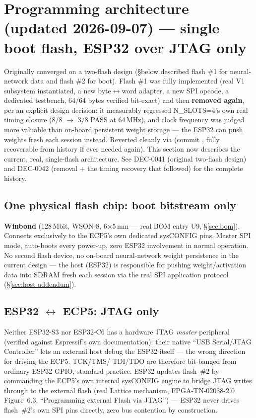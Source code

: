 \section{Programming architecture (updated 2026-09-07) --- single
boot flash, ESP32 over JTAG only}
\label{sec:prog-addendum}
\begin{fnwarn}
Originally converged on a two-flash design (\S below described flash
\#1 for neural-network data and flash \#2 for boot). Flash \#1 was
fully implemented (real V1 subsystem instantiated, a new byte$\leftrightarrow$word
adapter, a new SPI opcode, a dedicated testbench, 64/64 bytes verified
bit-exact) and then \textbf{removed again}, per an explicit design
decision: it measurably regressed N\_SLOTS=4's own real timing
closure (8/8 $\to$ 3/8 PASS at 64\,MHz), and clock frequency was
judged more valuable than on-board persistent weight storage --- the
ESP32 can push weights fresh each session instead. Reverted cleanly
via  (commit , fully recoverable from
history if ever needed again). This section now describes the
current, real, single-flash architecture. See 
DEC-0041 (original two-flash design) and DEC-0042 (removal + the
timing recovery that followed) for the complete history.
\end{fnwarn}

\subsection{One physical flash chip: boot bitstream only}
\textbf{Winbond } (128\,Mbit, WSON-8, 6$\times$5\,mm
--- real BOM entry U9, \S\ref{sec:bom}). Connects exclusively to the
ECP5's own dedicated sysCONFIG pins, Master SPI mode, auto-boots every
power-up, zero ESP32 involvement in normal operation. No second flash
device, no on-board neural-network
weight persistence in the current design --- the host (ESP32) is
responsible for pushing weight/activation data into SDRAM fresh each
session via the real SPI application protocol
(\S\ref{sec:host-addendum}).

\subsection{ESP32 $\leftrightarrow$ ECP5: JTAG only}
Neither ESP32-S3 nor ESP32-C6 has a hardware JTAG \emph{master}
peripheral (verified against Espressif's own documentation): their
native ``USB Serial/JTAG Controller'' lets an external host debug the
ESP32 itself --- the wrong direction for driving the ECP5. TCK/TMS/
TDI/TDO are therefore bit-banged from ordinary ESP32 GPIO, standard
practice. ESP32 updates flash~\#2 by commanding the ECP5's own
internal sysCONFIG engine to bridge JTAG writes through to the
external flash (real Lattice mechanism, FPGA-TN-02038-2.0 Figure~6.3,
``Programming external Flash via JTAG'') --- ESP32 never drives
flash~\#2's own SPI pins directly, zero bus contention by
construction.

